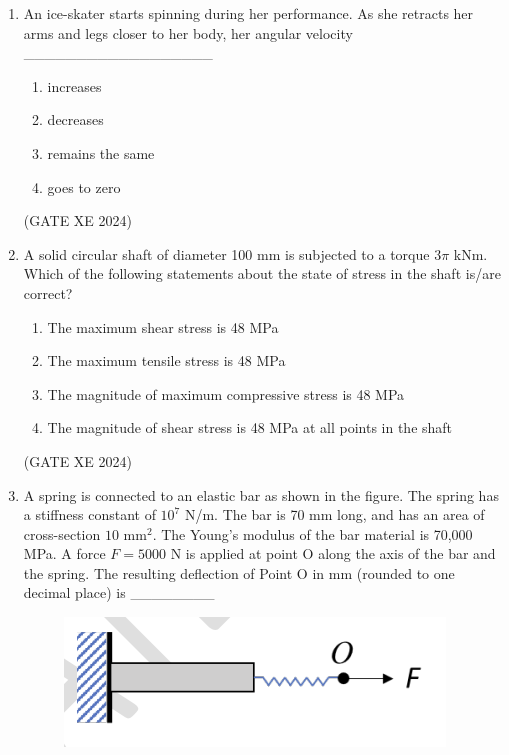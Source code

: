 \documentclass[12pt]{article}
\begin{document}
\begin{enumerate}
\begin{enumerate}
\item $\dfrac{3P}{2wh}, \ \dfrac{3PL}{2wh^2}$
\item $0, \ \dfrac{3PL}{2wh^2}$
\item $\dfrac{3P}{2wh}, \ 0$
\item $0, \ 0$
\end{enumerate}

(GATE XE 2024)

\item An ice-skater starts spinning during her performance. As she retracts her arms and legs closer to her body, her angular velocity \_\_\_\_\_\_\_\_\_\_\_\_\_\_\_\_\_\_

\begin{enumerate}
\item increases
\item decreases
\item remains the same
\item goes to zero
\end{enumerate}

(GATE XE 2024)

\item A solid circular shaft of diameter 100 mm is subjected to a torque $3\pi$ kNm. Which of the following statements about the state of stress in the shaft is/are correct?

\begin{enumerate}
\item The maximum shear stress is 48 MPa
\item The maximum tensile stress is 48 MPa
\item The magnitude of maximum compressive stress is 48 MPa
\item The magnitude of shear stress is 48 MPa at all points in the shaft
\end{enumerate}

(GATE XE 2024)

\item A spring is connected to an elastic bar as shown in the figure. The spring has a stiffness constant of $10^7$ N/m. The bar is 70 mm long, and has an area of cross-section $10$ mm$^2$. The Young’s modulus of the bar material is 70,000 MPa. A force $F = 5000$ N is applied at point O along the axis of the bar and the spring. The resulting deflection of Point O in mm (rounded to one decimal place) is \_\_\_\_\_\_\_\_

\begin{figure}[H]
    \centering
    \includegraphics[width=0.5\columnwidth]{figs/ass5_d_q73.png}
    \caption{}
    \label{fig:placeholder}
\end{figure}


\end{enumerate}
\end{document}
